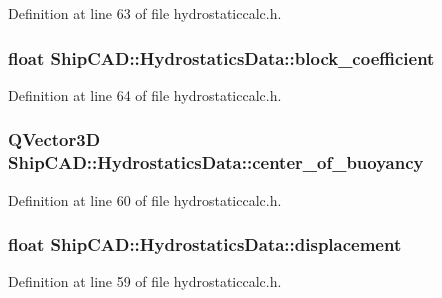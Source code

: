Definition at line 63 of file hydrostaticcalc.\-h.

\hypertarget{structShipCAD_1_1HydrostaticsData_ac59c717b9869f0aacca4305fd81d4882}{
\subsubsection[{block\-\_\-coefficient}]{\setlength{\rightskip}{0pt plus 5cm}float Ship\-C\-A\-D\-::\-Hydrostatics\-Data\-::block\-\_\-coefficient}}\label{structShipCAD_1_1HydrostaticsData_ac59c717b9869f0aacca4305fd81d4882}


Definition at line 64 of file hydrostaticcalc.\-h.

\hypertarget{structShipCAD_1_1HydrostaticsData_a316b31598f53f036c7008cc4910293f8}{
\subsubsection[{center\-\_\-of\-\_\-buoyancy}]{\setlength{\rightskip}{0pt plus 5cm}Q\-Vector3\-D Ship\-C\-A\-D\-::\-Hydrostatics\-Data\-::center\-\_\-of\-\_\-buoyancy}}\label{structShipCAD_1_1HydrostaticsData_a316b31598f53f036c7008cc4910293f8}


Definition at line 60 of file hydrostaticcalc.\-h.

\hypertarget{structShipCAD_1_1HydrostaticsData_a92d1a8a97eb9b21bad485e40ac4461a0}{
\subsubsection[{displacement}]{\setlength{\rightskip}{0pt plus 5cm}float Ship\-C\-A\-D\-::\-Hydrostatics\-Data\-::displacement}}\label{structShipCAD_1_1HydrostaticsData_a92d1a8a97eb9b21bad485e40ac4461a0}


Definition at line 59 of file hydrostaticcalc.\-h.

